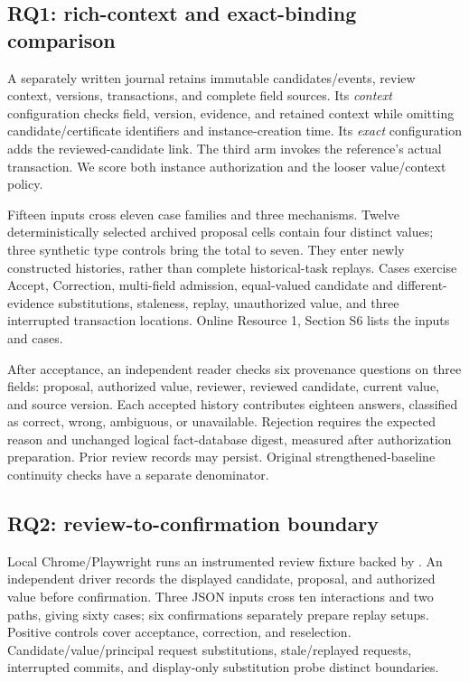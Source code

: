 \subsection{RQ1: rich-context and exact-binding comparison}

A separately written  journal retains immutable candidates/events, review context, versions, transactions, and complete field sources. Its \emph{context} configuration checks field, version, evidence, and retained context while omitting candidate/certificate identifiers and instance-creation time. Its \emph{exact} configuration adds the reviewed-candidate link. The third arm invokes the reference's actual transaction. We score both instance authorization and the looser value/context policy.

Fifteen inputs cross eleven case families and three mechanisms. Twelve deterministically selected archived proposal cells contain four distinct values; three synthetic type controls bring the total to seven. They enter newly constructed histories, rather than complete historical-task replays. Cases exercise Accept, Correction, multi-field admission, equal-valued candidate and different-evidence substitutions, staleness, replay, unauthorized value, and three interrupted transaction locations. Online Resource 1, Section S6 lists the inputs and cases.

After acceptance, an independent reader checks six provenance questions on three fields: proposal, authorized value, reviewer, reviewed candidate, current value, and source version. Each accepted history contributes eighteen answers, classified as correct, wrong, ambiguous, or unavailable. Rejection requires the expected reason and unchanged logical fact-database digest, measured after authorization preparation. Prior review records may persist. Original strengthened-baseline continuity checks have a separate denominator.

\subsection{RQ2: review-to-confirmation boundary}

Local Chrome/Playwright runs an instrumented review fixture backed by . An independent driver records the displayed candidate, proposal, and authorized value before confirmation. Three JSON inputs cross ten interactions and two paths, giving sixty cases; six confirmations separately prepare replay setups. Positive controls cover acceptance, correction, and reselection. Candidate/value/principal request substitutions, stale/replayed requests, interrupted commits, and display-only substitution probe distinct boundaries.

